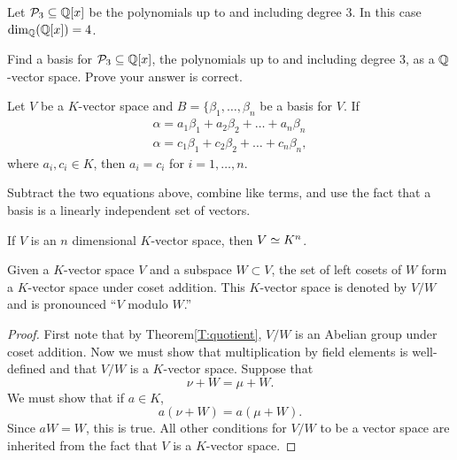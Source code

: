 \documentclass{ximera}
\begin{document}
\begin{example}
  Let $\mathcal{P}_3\subseteq \mathbb Q[x]$ be the polynomials up to and including degree
  $3$. In this case $\dim_{\mathbb Q}(\mathbb Q[x]) = 4$.
\end{example}

\begin{exercise}
  Find a basis for $\mathcal{P}_3\subseteq \mathbb Q[x]$, the polynomials up to and
  including degree $3$, as a $\mathbb Q$-vector space. Prove your answer is
  correct.
\end{exercise}


\begin{theorem}
  Let $V$ be a $K$-vector space and $B = \{\beta_1,\dots,\beta_n$ be a
  basis for $V$. If
  \begin{align*}
  \alpha = a_1\beta_1 + a_2\beta_2 + \dots + a_n\beta_n\\
  \alpha = c_1\beta_1 + c_2\beta_2 + \dots + c_n\beta_n,
  \end{align*}
  where $a_i, c_i\in K$, then $a_i = c_i$ for $i =1,\dots, n$.
  \begin{sketch}
    Subtract the two equations above, combine like terms, and use the
    fact that a basis is a linearly independent set of vectors.
  \end{sketch}
\end{theorem}


\begin{corollary}
  If $V$ is an $n$ dimensional $K$-vector space, then $V\simeq K^n$.
\end{corollary}



\begin{theorem}
  Given a $K$-vector space $V$ and a subspace $W\subset V$, the set of
  left cosets of $W$ form a $K$-vector space under coset
  addition. This $K$-vector space is denoted by $V/W$ and is
  pronounced ``$V$ modulo $W$.''
  \begin{proof}
    First note that by Theorem\ref{T:quotient}, $V/W$ is an Abelian
    group under coset addition. Now we must show that multiplication
    by field elements is well-defined and that
    $V/W$ is a $K$-vector space. Suppose that
    \[
    \nu + W = \mu + W.
    \]
    We must show that if $a\in K$,
    \[
    a(\nu + W) = a(\mu + W).
    \]
    Since $aW = W$, this is true. All other conditions for $V/W$ to be
    a vector space are inherited from the fact that $V$ is a $K$-vector
    space.
  \end{proof}
\end{theorem}
\end{document}
